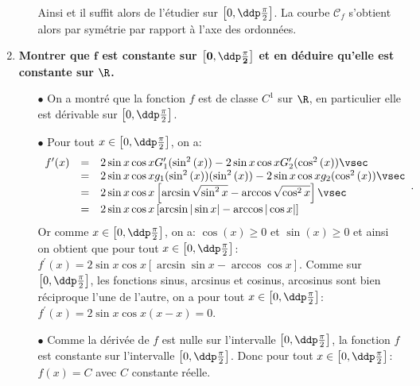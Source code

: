 \documentclass[a4paper, 11pt,reqno]{article}
\begin{document}
\begin{correction}
\begin{enumerate}
\begin{itemize}
			            Ainsi  et il suffit alors de l'\'etudier sur $\left\lbrack 0,\ddp\frac{\pi}{2}\right\rbrack$. La courbe $\mathcal{C}_f$ s'obtient alors par sym\'etrie par rapport \`{a} l'axe des ordonn\'ees.
		      \end{itemize}
		\item \textbf{Montrer que $\mathbf{f}$ est constante sur $\mathbf{\left\lbrack 0,\ddp\frac{\pi}{2}\right\rbrack}$ et en d\'eduire qu'elle est constante sur $\mathbf{\R}$.}
		      \begin{itemize}
			      \item[$\bullet$] On a montr\'e que la fonction $f$ est de classe $C^1$ sur $\R$, en particulier elle est d\'erivable sur $\left\lbrack 0,\ddp\frac{\pi}{2}\right\rbrack$.
			      \item[$\bullet$] Pour tout $x\in \left\lbrack 0,\ddp\frac{\pi}{2}\right\rbrack$, on a:
			            $$\begin{array}{lll}
					            f^{\prime}(x) & = & 2\sin{x}\cos{x}G_1^{\prime}(\sin^2{(x)})-2\sin{x}\cos{x}G_2^{\prime}(\cos^2{(x)})\vsec                 \\
					                          & = & 2\sin{x}\cos{x}g_1(\sin^2{(x)})(\sin^2{(x)})-2\sin{x}\cos{x}g_2(\cos^2{(x)})\vsec                      \\
					                          & = & 2\sin{x}\cos{x}\left\lbrack  \arcsin{\sqrt{\sin^2{x}}}-\arccos{\sqrt{\cos^2{x}}}    \right\rbrack\vsec \\
					                          & = & 2\sin{x}\cos{x}\left\lbrack  \arcsin{|\sin{x}|}-\arccos{|\cos{x}|}    \right\rbrack
				            \end{array}.$$
			            Or comme $x\in  \left\lbrack 0,\ddp\frac{\pi}{2}\right\rbrack$, on a: $\cos{(x)}\geq 0$ et $\sin{(x)}\geq 0$ et ainsi on obtient que pour tout $x\in  \left\lbrack 0,\ddp\frac{\pi}{2}\right\rbrack$: $f^{\prime}(x)=2\sin{x}\cos{x}\left\lbrack  \arcsin{\sin{x}}-\arccos{\cos{x}}    \right\rbrack$. Comme sur $ \left\lbrack 0,\ddp\frac{\pi}{2}\right\rbrack$, les fonctions sinus, arcsinus et cosinus, arcosinus sont bien r\'eciproque l'une de l'autre, on a pour tout $x\in  \left\lbrack 0,\ddp\frac{\pi}{2}\right\rbrack$: $f^{\prime}(x)=2\sin{x}\cos{x}(x-x)=0$.
			      \item[$\bullet$] Comme la d\'eriv\'ee de $f$ est nulle sur l'intervalle $ \left\lbrack 0,\ddp\frac{\pi}{2}\right\rbrack$, la fonction $f$ est constante sur l'intervalle $ \left\lbrack 0,\ddp\frac{\pi}{2}\right\rbrack$. Donc pour tout $x\in  \left\lbrack 0,\ddp\frac{\pi}{2}\right\rbrack$: $f(x)=C$ avec $C$ constante r\'eelle.

\end{itemize}
\end{enumerate}
\end{correction}
\end{document}
